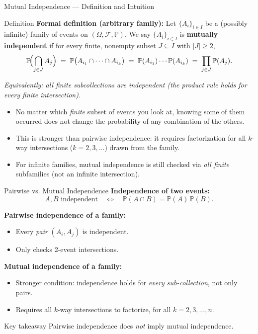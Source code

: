 \documentclass{beamer}
\newcommand{\1}{\mathbf{1}}
\begin{document}
\begin{frame}{Mutual Independence — Definition and Intuition}
  \small
  \begin{block}{Definition}
    \textbf{Formal definition (arbitrary family):}
    Let $\{A_i\}_{i\in I}$ be a (possibly infinite) family of events on $(\Omega,\mathcal{F},\mathbb{P})$.
    We say $\{A_i\}_{i\in I}$ is \textbf{mutually independent} if for every finite, nonempty subset
    $J \subseteq I$ with $|J|\ge 2$,
    \[
      \mathbb{P}\!\Bigl(\bigcap_{j\in J} A_j\Bigr)
      \;=\; \mathbb{P}\bigl( A_{i_1} \cap \cdots \cap A_{i_k} \bigr) \;=\; \mathbb{P}(A_{i_1}) \cdots \mathbb{P}(A_{i_k}) \;=\; \prod_{j\in J}\mathbb{P}(A_j).
    \]
  \end{block}

  \emph{Equivalently: all finite subcollections are independent (the product rule holds for every finite intersection).}

  \medskip
  \begin{itemize}
    \item No matter which \emph{finite} subset of events you look at, knowing some of them occurred does not change the probability of any combination of the others.
    \item This is stronger than pairwise independence: it requires factorization for all $k$-way intersections ($k=2,3,\dots$) drawn from the family.
    \item For infinite families, mutual independence is still checked via \emph{all finite} subfamilies (not an infinite intersection).
  \end{itemize}
\end{frame}

\begin{frame}{Pairwise vs. Mutual Independence}
  \textbf{Independence of two events:}
  \[
    A, B \text{ independent} \quad \iff \quad \mathbb{P}(A \cap B) = \mathbb{P}(A)\,\mathbb{P}(B).
  \]

  \textbf{Pairwise independence of a family:}
  \begin{itemize}
    \item Every \emph{pair} $(A_i, A_j)$ is independent.
    \item Only checks 2-event intersections.
  \end{itemize}

  \medskip
  \textbf{Mutual independence of a family:}
  \begin{itemize}
    \item Stronger condition: independence holds for \emph{every sub-collection}, not only pairs.
    \item Requires all $k$-way intersections to factorize, for all $k=2,3,\dots,n$.
  \end{itemize}

  \begin{exampleblock}{Key takeaway}
    Pairwise independence does \emph{not} imply mutual independence.
  \end{exampleblock}
\end{frame}
\end{document}
